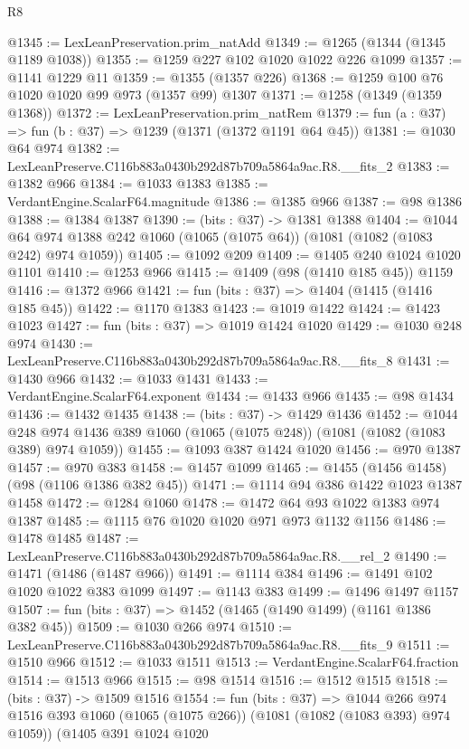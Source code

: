 \begin{lexlean}{R8}
\begin{coremodule}
@1345 := LexLeanPreservation.prim_natAdd
@1349 := @1265 (@1344 (@1345 @1189 @1038))
@1355 := @1259 @227 @102 @1020 @1022 @226 @1099
@1357 := @1141 @1229 @11
@1359 := @1355 (@1357 @226)
@1368 := @1259 @100 @76 @1020 @1020 @99 @973 (@1357 @99) @1307
@1371 := @1258 (@1349 (@1359 @1368))
@1372 := LexLeanPreservation.prim_natRem
@1379 := fun (a : @37) => fun (b : @37) => @1239 (@1371 (@1372 @1191 @64 @45))
@1381 := @1030 @64 @974
@1382 := LexLeanPreserve.C116b883a0430b292d87b709a5864a9ac.R8.__fits_2
@1383 := @1382 @966
@1384 := @1033 @1383
@1385 := VerdantEngine.ScalarF64.magnitude
@1386 := @1385 @966
@1387 := @98 @1386
@1388 := @1384 @1387
@1390 := (bits : @37) -> @1381 @1388
@1404 := @1044 @64 @974 @1388 @242 @1060 (@1065 (@1075 @64)) (@1081 (@1082 (@1083 @242) @974 @1059))
@1405 := @1092 @209
@1409 := @1405 @240 @1024 @1020 @1101
@1410 := @1253 @966
@1415 := @1409 (@98 (@1410 @185 @45)) @1159
@1416 := @1372 @966
@1421 := fun (bits : @37) => @1404 (@1415 (@1416 @185 @45))
@1422 := @1170 @1383
@1423 := @1019 @1422
@1424 := @1423 @1023
@1427 := fun (bits : @37) => @1019 @1424 @1020
@1429 := @1030 @248 @974
@1430 := LexLeanPreserve.C116b883a0430b292d87b709a5864a9ac.R8.__fits_8
@1431 := @1430 @966
@1432 := @1033 @1431
@1433 := VerdantEngine.ScalarF64.exponent
@1434 := @1433 @966
@1435 := @98 @1434
@1436 := @1432 @1435
@1438 := (bits : @37) -> @1429 @1436
@1452 := @1044
    @248
    @974
    @1436
    @389
    @1060
    (@1065 (@1075 @248))
    (@1081 (@1082 (@1083 @389) @974 @1059))
@1455 := @1093 @387 @1424 @1020
@1456 := @970 @1387
@1457 := @970 @383
@1458 := @1457 @1099
@1465 := @1455 (@1456 @1458) (@98 (@1106 @1386 @382 @45))
@1471 := @1114 @94 @386 @1422 @1023 @1387 @1458
@1472 := @1284 @1060
@1478 := @1472 @64 @93 @1022 @1383 @974 @1387
@1485 := @1115 @76 @1020 @1020 @971 @973 @1132 @1156
@1486 := @1478 @1485
@1487 := LexLeanPreserve.C116b883a0430b292d87b709a5864a9ac.R8.__rel_2
@1490 := @1471 (@1486 (@1487 @966))
@1491 := @1114 @384
@1496 := @1491 @102 @1020 @1022 @383 @1099
@1497 := @1143 @383
@1499 := @1496 @1497 @1157
@1507 := fun (bits : @37) => @1452 (@1465 (@1490 @1499) (@1161 @1386 @382 @45))
@1509 := @1030 @266 @974
@1510 := LexLeanPreserve.C116b883a0430b292d87b709a5864a9ac.R8.__fits_9
@1511 := @1510 @966
@1512 := @1033 @1511
@1513 := VerdantEngine.ScalarF64.fraction
@1514 := @1513 @966
@1515 := @98 @1514
@1516 := @1512 @1515
@1518 := (bits : @37) -> @1509 @1516
@1554 := fun (bits : @37) =>
  @1044
    @266
    @974
    @1516
    @393
    @1060
    (@1065 (@1075 @266))
    (@1081 (@1082 (@1083 @393) @974 @1059))
    (@1405
      @391
      @1024
      @1020

\end{coremodule}
\end{lexlean}
